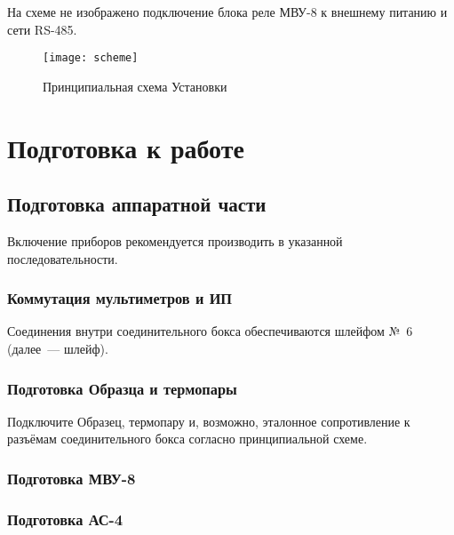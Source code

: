 \documentclass[12pt, a4paper, twocolumn]{report}
\begin{document}
На схеме не изображено подключение блока реле МВУ-8 к внешнему питанию и сети RS-485.

\begin{figure*}
\begin{center}
\texttt{[image: scheme]}
\end{center}
\caption{Принципиальная схема Установки}
\label{pic-scheme}
\end{figure*}

\chapter{Подготовка к работе}

\section{Подготовка аппаратной части}

Включение приборов рекомендуется производить в указанной последовательности.

\subsection{Коммутация мультиметров и ИП}

Соединения внутри соединительного бокса обеспечиваются шлейфом №~6 (далее~--- шлейф).



\subsection{Подготовка Образца и термопары}

Подключите Образец, термопару и, возможно, эталонное сопротивление к разъёмам соединительного бокса согласно принципиальной схеме.

\subsection{Подготовка МВУ-8}



\subsection{Подготовка АС-4}


\end{document}
